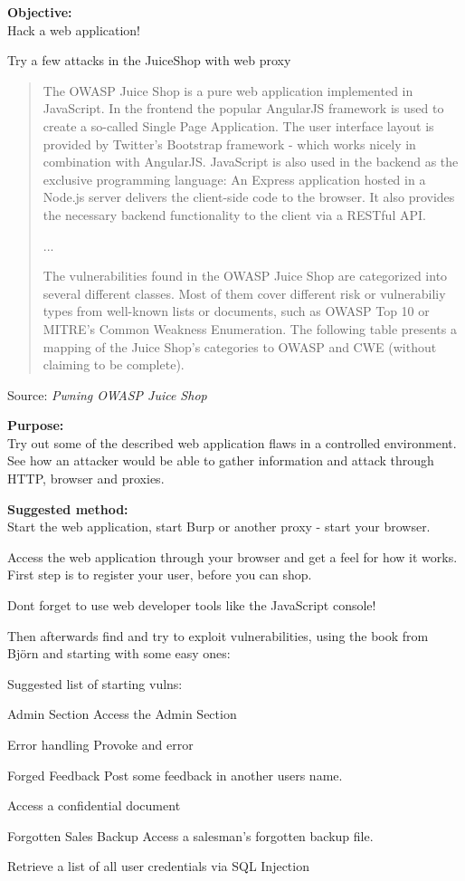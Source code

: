 \documentclass[a4paper,11pt,notitlepage]{report}
\begin{document}

 {\bf Objective:}\\
Hack a web application!

Try a few attacks in the JuiceShop with web proxy

\begin{quote}
The OWASP Juice Shop is a pure web application implemented in JavaScript. In the
frontend the popular AngularJS framework is used to create a so-called Single Page
Application. The user interface layout is provided by Twitter's Bootstrap framework - which
works nicely in combination with AngularJS.
JavaScript is also used in the backend as the exclusive programming language: An Express
application hosted in a Node.js server delivers the client-side code to the browser. It also
provides the necessary backend functionality to the client via a RESTful API.

...

The vulnerabilities found in the OWASP Juice Shop are categorized into several different
classes. Most of them cover different risk or vulnerabiliy types from well-known lists or
documents, such as OWASP Top 10 or MITRE's Common Weakness Enumeration. The
following table presents a mapping of the Juice Shop's categories to OWASP and CWE
(without claiming to be complete).
\end{quote}

Source: \emph{Pwning OWASP Juice Shop}


 {\bf Purpose:}\\
 Try out some of the described web application flaws in a controlled environment. See how an attacker would be able to gather information and attack through HTTP, browser and proxies.

 {\bf Suggested method:}\\
Start the web application, start Burp or another proxy - start your browser.

Access the web application through your browser and get a feel for how it works. First step is to register your user, before you can shop.

Dont forget to use web developer tools like the JavaScript console!

Then afterwards find and try to exploit vulnerabilities, using the book from Björn and starting with some easy ones:

Suggested list of starting vulns:
\begin{list2}
\item Admin Section Access the Admin Section
\item Error handling Provoke and error
\item Forged Feedback Post some feedback in another users name.
\item Access a confidential document
\item Forgotten Sales Backup Access a salesman's forgotten backup file.
\item Retrieve a list of all user credentials via SQL Injection
\end{list2}
\end{document}
